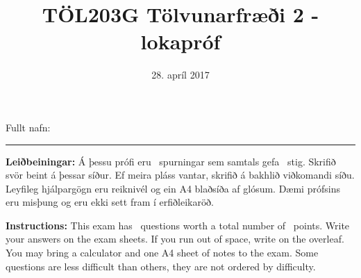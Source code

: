 \documentclass[addpoints]{exam}
\author{}
\date{}
\title{TÖL203G Tölvunarfræði 2 - lokapróf}
\author{}
\date{28. apríl 2017}
\begin{document}
Fullt nafn: \vspace*{1mm} \hrule

\begin{center}
	\begin{minipage}{.8\textwidth}

		\vspace{5cm}

		\textbf{Leiðbeiningar:} Á þessu prófi eru \numquestions\ spurningar sem samtals gefa \numpoints\ stig. Skrifið svör beint á þessar síður. Ef meira pláss vantar, skrifið á bakhlið viðkomandi síðu. Leyfileg hjálpargögn eru reiknivél og ein A4 blaðsíða af glósum. Dæmi prófsins eru misþung og eru ekki sett fram í erfiðleikaröð.

		\vspace{0.5cm}

		\textbf{Instructions:} This exam has \numquestions\ questions worth a total number of \numpoints\ points. Write your answers on the exam sheets. If you run out of space, write on the overleaf. You may bring a calculator and one A4 sheet of notes to the exam. Some questions are less difficult than others, they are not ordered by difficulty.
	\end{minipage}
\end{center}

\vfill
\begin{center}
	\cellwidth{1.5em}
	\gradetable[h][questions]
\end{center}

\newpage
\end{document}
